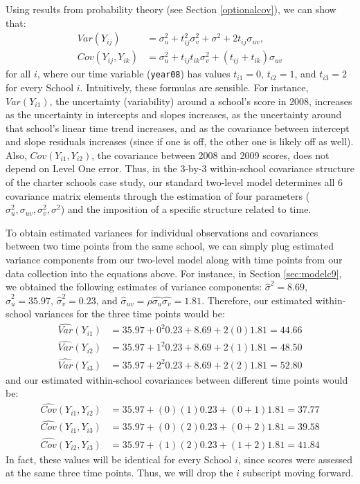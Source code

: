 \documentclass[
]{krantz}
\begin{document}
Using results from probability theory (see Section \ref{optionalcov}), we can show that:
\begin{align*}
Var(Y_{ij}) & = \sigma_{u}^{2} + t^{2}_{ij} \sigma_{v}^{2} + \sigma^{2} + 2t_{ij}\sigma_{uv}, \\
Cov(Y_{ij},Y_{ik}) & = \sigma_{u}^{2} + t_{ij}t_{ik} \sigma_{v}^{2} + (t_{ij}+t_{ik})\sigma_{uv}
\end{align*}
for all \(i\), where our time variable (\texttt{year08}) has values \(t_{i1}=0\), \(t_{i2}=1\), and \(t_{i3}=2\) for every School \(i\). Intuitively, these formulas are sensible. For instance, \(Var(Y_{i1})\), the uncertainty (variability) around a school's score in 2008, increases as the uncertainty in intercepts and slopes increases, as the uncertainty around that school's linear time trend increases, and as the covariance between intercept and slope residuals increases (since if one is off, the other one is likely off as well). Also, \(Cov(Y_{i1},Y_{i2})\), the covariance between 2008 and 2009 scores, does not depend on Level One error. Thus, in the 3-by-3 within-school covariance structure of the charter schools case study, our standard two-level model determines all 6 covariance matrix elements through the estimation of four parameters (\(\sigma_{u}^{2}, \sigma_{uv}, \sigma_{v}^{2}, \sigma^2\)) and the imposition of a specific structure related to time.

To obtain estimated variances for individual observations and covariances between two time points from the same school, we can simply plug estimated variance components from our two-level model along with time points from our data collection into the equations above. For instance, in Section \ref{sec:modelc9}, we obtained the following estimates of variance components: \(\hat{\sigma}^{2}=8.69\), \(\hat{\sigma}^{2}_{u}=35.97\), \(\hat{\sigma}^{2}_{v}=0.23\), and \(\hat{\sigma}_{uv}=\hat{\rho}\hat{\sigma_{u}}\hat{\sigma_{v}}=1.81\). Therefore, our estimated within-school variances for the three time points would be:
\begin{align*}
\hat{Var}(Y_{i1}) & = 35.97 + 0^{2} 0.23 + 8.69 + 2(0)1.81 = 44.66 \\
\hat{Var}(Y_{i2}) & = 35.97 + 1^{2} 0.23 + 8.69 + 2(1)1.81 = 48.50 \\
\hat{Var}(Y_{i3}) & = 35.97 + 2^{2} 0.23 + 8.69 + 2(2)1.81 = 52.80
\end{align*}
\noindent and our estimated within-school covariances between different time points would be:
\begin{align*}
\hat{Cov}(Y_{i1},Y_{i2}) & = 35.97 + (0)(1)0.23 + (0+1)1.81 = 37.77 \\
\hat{Cov}(Y_{i1},Y_{i3}) & = 35.97 + (0)(2)0.23 + (0+2)1.81 = 39.58 \\
\hat{Cov}(Y_{i2},Y_{i3}) & = 35.97 + (1)(2)0.23 + (1+2)1.81 = 41.84
\end{align*}
In fact, these values will be identical for every School \(i\), since scores were assessed at the same three time points. Thus, we will drop the \(i\) subscript moving forward.
\end{document}

